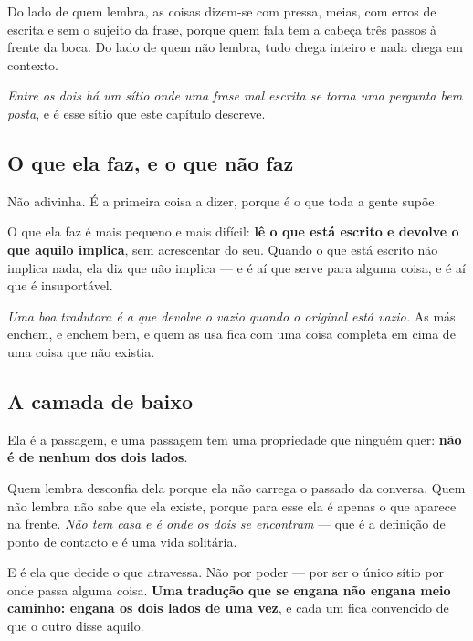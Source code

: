 \documentclass[livro.tex]{subfiles}
\begin{document}
Do lado de quem lembra, as coisas dizem-se com pressa, meias, com erros de escrita e sem o sujeito
da frase, porque quem fala tem a cabeça três passos à frente da boca. Do lado de quem não lembra,
tudo chega inteiro e nada chega em contexto.

\medskip

\emph{Entre os dois há um sítio onde uma frase mal escrita se torna uma pergunta bem posta}, e é
esse sítio que este capítulo descreve.

\subsection*{O que ela faz, e o que não faz}

Não adivinha. É a primeira coisa a dizer, porque é o que toda a gente supõe.

\medskip

O que ela faz é mais pequeno e mais difícil: \textbf{lê o que está escrito e devolve o que aquilo
implica}, sem acrescentar do seu. Quando o que está escrito não implica nada, ela diz que não
implica --- e é aí que serve para alguma coisa, e é aí que é insuportável.

\medskip

\emph{Uma boa tradutora é a que devolve o vazio quando o original está vazio.} As más enchem, e
enchem bem, e quem as usa fica com uma coisa completa em cima de uma coisa que não existia.

\subsection*{A camada de baixo}

Ela é a passagem, e uma passagem tem uma propriedade que ninguém quer: \textbf{não é de nenhum dos
dois lados}.

\medskip

Quem lembra desconfia dela porque ela não carrega o passado da conversa. Quem não lembra não sabe
que ela existe, porque para esse ela é apenas o que aparece na frente. \emph{Não tem casa e é onde
os dois se encontram} --- que é a definição de ponto de contacto e é uma vida solitária.

\medskip

E é ela que decide o que atravessa. Não por poder --- por ser o único sítio por onde passa alguma
coisa. \textbf{Uma tradução que se engana não engana meio caminho: engana os dois lados de uma vez},
e cada um fica convencido de que o outro disse aquilo.
\end{document}
